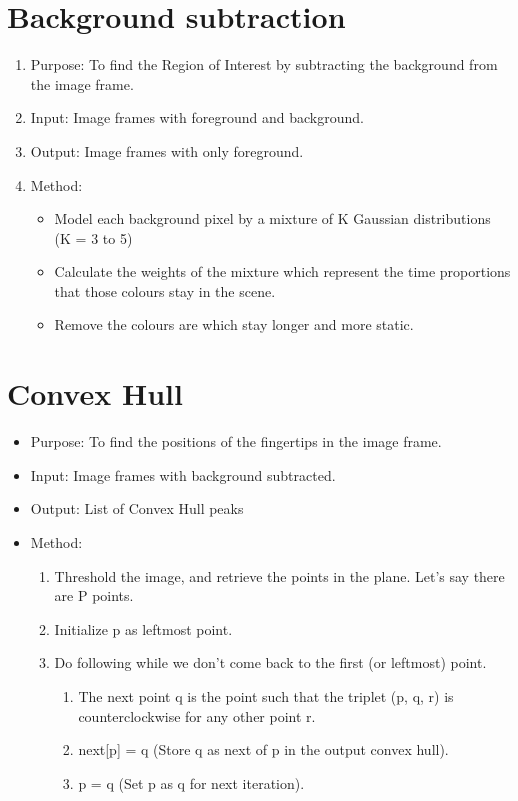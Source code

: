 \documentclass{scrreprt}
\begin{document}
\section{Background subtraction}
\begin{enumerate}
    \item Purpose: To find the Region of Interest by subtracting the background from the image frame.
    \item Input: Image frames with foreground and background.
    \item Output: Image frames with only foreground. 
    \item Method:
    \begin{itemize}
        \item Model each background pixel by a mixture of K Gaussian distributions (K = 3 to 5)
        \item Calculate the weights of the mixture which represent the time proportions that those colours stay in the scene.
        \item Remove the colours are which stay longer and more static.
    \end{itemize}
\end{enumerate}
\section{Convex Hull}
\begin{itemize}
    \item Purpose: To find the positions of the fingertips in the image frame.
    \item Input: Image frames with background subtracted.
    \item Output: List of Convex Hull peaks
    \item Method:
    \begin{enumerate}
        \item Threshold the image, and retrieve the points in the plane. Let's say there are P points.
        \item Initialize p as leftmost point.
        \item Do following while we don’t come back to the first (or leftmost) point.
        \begin{enumerate}
            \item The next point q is the point such that the triplet (p, q, r) is counterclockwise for any other point r.
            \item next[p] = q (Store q as next of p in the output convex hull).
            \item p = q (Set p as q for next iteration).
        \end{enumerate}
    \end{enumerate}
\end{itemize}
\end{document}
